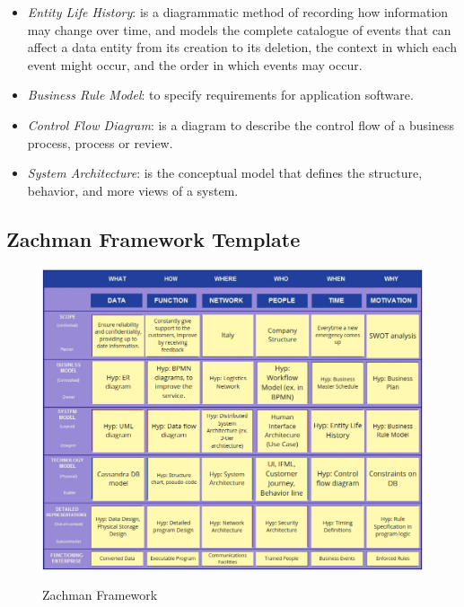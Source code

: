\documentclass[../main.tex]{subfiles}
\begin{document}
\begin{itemize}
        \item \textit{Entity Life History}: is a diagrammatic method of recording how information may change over time, and models the complete catalogue of events that can affect a data entity from its creation to its deletion, the context in which each event might occur, and the order in which events may occur.
        \item \textit{Business Rule Model}: to specify requirements for application software.
        \item \textit{Control Flow Diagram}: is a diagram to describe the control flow of a business process, process or review.
        \item \textit{System Architecture}: is the conceptual model that defines the structure, behavior, and more views of a system.
    \end{itemize}
    \subsection{Zachman Framework Template}
    \begin{figure}[H]
        \centering
        \includegraphics[scale = 0.5]{assets/zachman.png} \\
        \caption[]{Zachman Framework}\label{fig:figure12}
    \end{figure}
    \newpage
\end{document}

